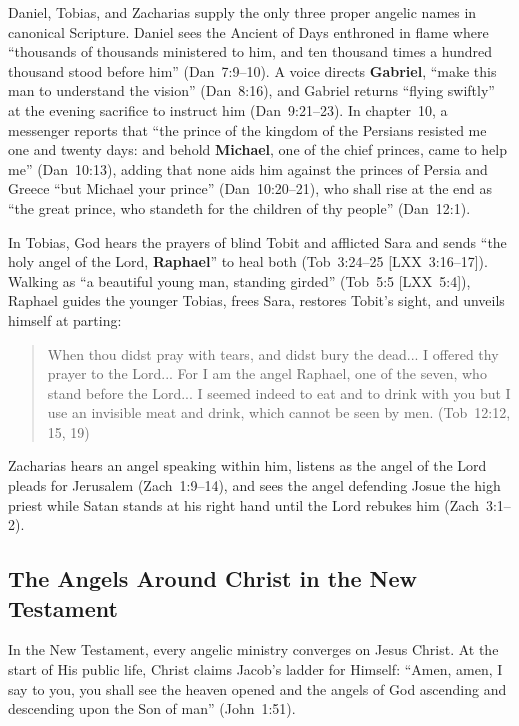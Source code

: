 Daniel, Tobias, and Zacharias supply the only three proper angelic names in canonical Scripture. Daniel sees the Ancient of Days enthroned in flame where ``thousands of thousands ministered to him, and ten thousand times a hundred thousand stood before him'' (Dan~7:9--10). A voice directs \textbf{Gabriel}, ``make this man to understand the vision'' (Dan~8:16), and Gabriel returns ``flying swiftly'' at the evening sacrifice to instruct him (Dan~9:21--23). In chapter~10, a messenger reports that ``the prince of the kingdom of the Persians resisted me one and twenty days: and behold \textbf{Michael}, one of the chief princes, came to help me'' (Dan~10:13), adding that none aids him against the princes of Persia and Greece ``but Michael your prince'' (Dan~10:20--21), who shall rise at the end as ``the great prince, who standeth for the children of thy people'' (Dan~12:1).

In Tobias, God hears the prayers of blind Tobit and afflicted Sara and sends ``the holy angel of the Lord, \textbf{Raphael}'' to heal both (Tob~3:24--25 [LXX~3:16--17]). Walking as ``a beautiful young man, standing girded'' (Tob~5:5 [LXX~5:4]), Raphael guides the younger Tobias, frees Sara, restores Tobit's sight, and unveils himself at parting:
\begin{quotation}
When thou didst pray with tears, and didst bury the dead... I offered thy prayer to the Lord... For I am the angel Raphael, one of the seven, who stand before the Lord... I seemed indeed to eat and to drink with you but I use an invisible meat and drink, which cannot be seen by men. (Tob~12:12, 15, 19)
\end{quotation}
Zacharias hears an angel speaking within him, listens as the angel of the Lord pleads for Jerusalem (Zach~1:9--14), and sees the angel defending Josue the high priest while Satan stands at his right hand until the Lord rebukes him (Zach~3:1--2).

\subsection{The Angels Around Christ in the New Testament}
\label{subsec:nt-christ}

In the New Testament, every angelic ministry converges on Jesus Christ. At the start of His public life, Christ claims Jacob's ladder for Himself: ``Amen, amen, I say to you, you shall see the heaven opened and the angels of God ascending and descending upon the Son of man'' (John~1:51).

